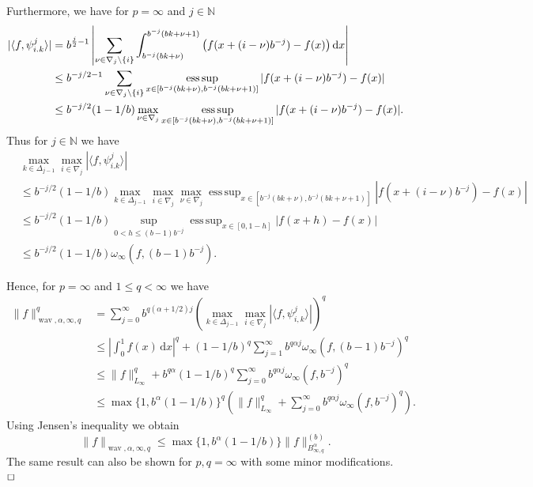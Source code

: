 \documentclass[12pt]{article}
\DeclareMathOperator{\wav}{wav}
\newenvironment{proof}{\begin{trivlist}
    \item[\hskip\labelsep{\it Proof.}]}{$\hfill\Box$\end{trivlist}}
\newcommand{\NN}{\mathbb{N}}
\newcommand{\esssup}{\mathop{\mathrm{ess\,sup}}}
\begin{document}
\begin{proof}
Furthermore, we have for $p=\infty$ and $j\in\NN$
\begin{equation*}
 \begin{split}
  |\langle f, \psi^j_{i.k}\rangle | &=
b^{\frac{j}{2}-1} \left| \sum_{\nu\in \nabla_j\setminus\{i\}}
\int_{b^{-j}(bk+\nu)}^{b^{-j}(bk+\nu+1)} \big(f(x+(i-\nu)b^{-j}) -f(x)\big)
\,{\rm d}x \right|\\
&\le b^{-j/2-1} \sum_{\nu\in \nabla_j\setminus\{i\}}
\esssup_{x \in [b^{-j} (bk+\nu), b^{-j} (bk+\nu+1)]} |f(x+(i-\nu)b^{-j}) -f(x)|
\\ & \le b^{-j/2} (1-1/b)\max_{\nu \in \nabla_j} \esssup_{x \in [b^{-j} (bk+\nu), b^{-j} (bk+\nu+1)]} |f(x+(i-\nu)b^{-j}) -f(x)|.
 \end{split}
\end{equation*}
Thus for $j \in \mathbb{N}$ we have
\begin{equation*}
 \begin{split}
  & \max_{k \in \Delta_{j-1}} \max_{i\in\nabla_j}
|\langle f, \psi^j_{i.k}\rangle | \\
&\le b^{- j/2} (1-1/b) \max_{k\in\Delta_{j-1}} \max_{i\in\nabla_j}
\max_{\nu\in \nabla_j} \esssup_{x \in [b^{-j}(bk+\nu), b^{-j}(bk+\nu+1)]} |f(x+(i-\nu)b^{-j}) -f(x)| \\
& \le b^{-j/2}(1-1/b) \sup_{0 < h \le (b-1) b^{-j} } \esssup_{x \in [0,1-h]} |f(x+h)-f(x)| \\
& \le b^{-j/2}(1-1/b) \omega_\infty(f,(b-1)b^{-j}).
 \end{split}
\end{equation*}

Hence, for $p = \infty$ and $1\le q <\infty$ we have
\begin{equation*}
\begin{split}
\|f\|_{\wav, \alpha,\infty,q}^q &= \sum_{j=0}^\infty b^{q(\alpha+1/2)j} \left(\max_{k \in \Delta_{j-1}} \max_{i \in \nabla_j} |\langle f, \psi^j_{i,k}\rangle | \right)^{q} \\
& \le \left|\int_0^1 f(x) \,\mathrm{d} x \right|^q +  (1-1/b)^q
\sum_{j=1}^\infty b^{q \alpha j} \omega_\infty(f,(b-1)b^{-j})^q \\
& \le \|f\|_{L_\infty}^q + b^{q \alpha} (1-1/b)^q
\sum_{j= 0}^\infty b^{q \alpha j} \omega_\infty(f, b^{-j})^q \\
& \le \max\{1, b^\alpha(1-1/b)\}^q \left(\|f\|_{L_\infty}^q + \sum_{j=0}^\infty b^{q \alpha j}
\omega_\infty(f, b^{-j})^q \right).
\end{split}
\end{equation*}
Using Jensen's inequality we obtain
\begin{equation*}
\|f\|_{\wav, \alpha, \infty, q} \le \max\{1, b^\alpha(1-1/b)\}
\|f\|^{(b)}_{B^\alpha_{\infty,q}}.
\end{equation*}
The same result can also be shown for $p,q=\infty$ with some minor modifications.
\end{proof}
\end{document}
